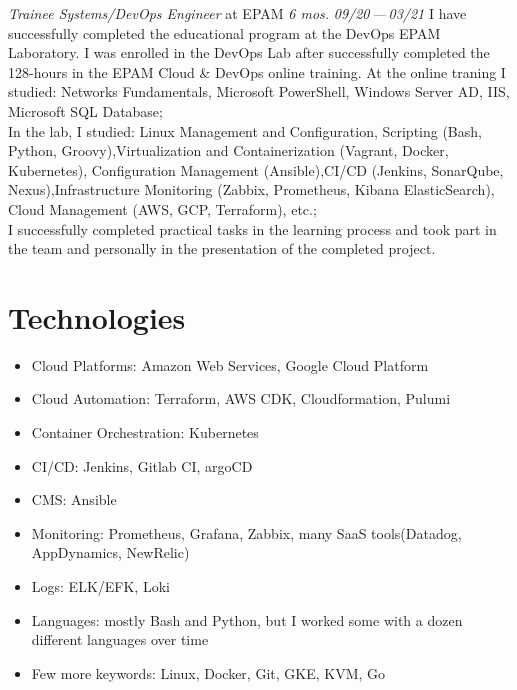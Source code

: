 \documentclass[11pt]{letter}
\newcommand{\forceindent}{\leavevmode{\parindent=1em\indent} %
}
\begin{document}
\begin{etaremune}[
  topsep=1ex,itemsep=1.5ex,partopsep=0ex,
  parsep=0ex,rightmargin=1em,leftmargin=2em
]
  \item
    \emph{Trainee Systems/DevOps Engineer}\hfill
    at EPAM\hspace{6.3em}
    \textit{6 mos.}\hspace{5em}
    \textit{09/20\,—\,03/21}\vspace{1em}\newline
    \forceindent I have successfully completed the educational program at the DevOps EPAM Laboratory. I was enrolled in the DevOps Lab after successfully completed the 128-hours in the EPAM Cloud \& DevOps online training. At the online traning I studied: 
	Networks Fundamentals, Microsoft PowerShell, Windows Server AD, IIS, Microsoft SQL Database; \\

	\forceindent In the lab, I studied: Linux Management and Configuration, Scripting (Bash, Python, Groovy),Virtualization and Containerization (Vagrant, Docker, Kubernetes), Configuration Management (Ansible),CI/CD (Jenkins, SonarQube, Nexus),Infrastructure Monitoring (Zabbix, Prometheus, Kibana ElasticSearch), Cloud Management (AWS, GCP, Terraform), etc.; \\
	
	\forceindent I successfully completed practical tasks in the learning process and took part in the team and personally in the presentation of the completed project.\\
\end{etaremune}
\section*{Technologies\vphantom{tech}}

\begin{itemize}
  \item Cloud Platforms: Amazon Web Services, Google Cloud Platform
  \item Cloud Automation: Terraform, AWS CDK, Cloudformation, Pulumi
  \item Container Orchestration: Kubernetes
  \item CI/CD: Jenkins, Gitlab CI, argoCD
  \item CMS: Ansible
  \item Monitoring: Prometheus, Grafana, Zabbix, many SaaS tools(Datadog, AppDynamics, NewRelic)
  \item Logs: ELK/EFK, Loki
  \item Languages: mostly Bash and Python, but I worked some with a dozen different languages over time
  \item Few more keywords: Linux, Docker, Git, GKE, KVM, Go
\end{itemize}
\end{document}
